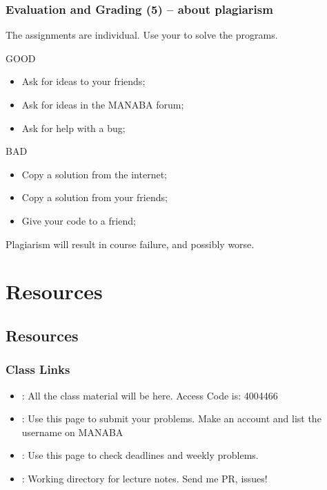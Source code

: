 \documentclass{beamer}
\begin{document}
\begin{frame}
  \frametitle{Evaluation and Grading (5) -- about plagiarism}
  
  The assignments are \alert{individual}. Use your  to solve the programs.

  \begin{exampleblock}{GOOD}
    \begin{itemize}
    \item Ask for ideas to your friends;
    \item Ask for ideas in the MANABA forum;
    \item Ask for help with a bug;
    \end{itemize}
  \end{exampleblock}

  \begin{alertblock}{BAD}
    \begin{itemize}
    \item Copy a solution from the internet;
    \item Copy a solution from your friends;
    \item Give your code to a friend;
    \end{itemize}
  \end{alertblock}

  Plagiarism will result in course failure, and possibly worse.
\end{frame}

\section{Resources}
\subsection{Resources}

\begin{frame}
  \frametitle{Class Links}
  \begin{itemize} 
  \item \href{https://manaba.tsukuba.ac.jp/ct/course_455573}{}: 
    All the class material will be here. Access Code is: 4004466

    \medskip

  \item \href{https://uva.onlinejudge.org/}{}:
    Use this page to submit your problems. \alert{Make an account and list the username on MANABA}

    \medskip

  \item \href{https://conclave.cs.tsukuba.ac.jp/lecture/monitor.html}{}:
    Use this page to check deadlines and weekly problems.

    \medskip

  \item
    \href{https://www.github.com/caranha/ProgrammingChallengesLectureNotes}{}:
    Working directory for lecture notes. Send me PR, issues!
  \end{itemize}
\end{frame}
\end{document}
